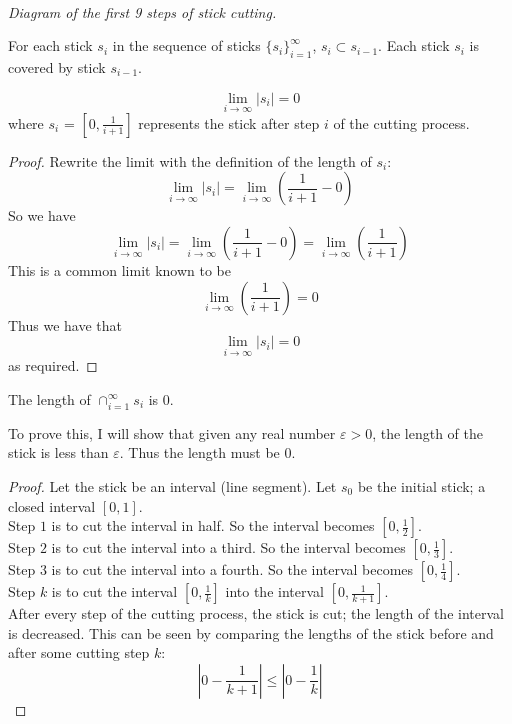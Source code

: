 \documentclass[11pt]{ekblite}
\begin{document}
\begin{example}
	\\\textit{Diagram of the first 9 steps of stick cutting.}
	\begin{corollary}
		For each stick $s_i$ in the sequence of sticks $\{s_i\}_{i=1}^{\infty}$, $s_{i} \subset s_{i-1}$. Each stick $s_i$ is covered by stick $s_{i-1}$. 
		\end{corollary}
	\begin{corollary}
	\[\lim_{i \rightarrow \infty} |s_i| = 0\]
	where $s_i$ = $[0,\frac{1}{i+1}]$ represents the stick after step $i$ of the cutting process.	
	\end{corollary}
	\begin{proof}
		Rewrite the limit with the definition of the length of $s_i$: 
		\[\lim_{i \rightarrow \infty} |s_i| = \lim_{i \rightarrow \infty} \left(\frac{1}{i+1} - 0 \right)\]
		So we have
		\[\lim_{i \rightarrow \infty} |s_i| = \lim_{i \rightarrow \infty} \left(\frac{1}{i+1} - 0 \right)= \lim_{i \rightarrow \infty} \left(\frac{1}{i+1} \right)\]
		This is a common limit known to be
		\[\lim_{i \rightarrow \infty} \left(\frac{1}{i+1} \right) = 0\]
		Thus we have that
		\[\lim_{i \rightarrow \infty} |s_i| = 0\]
		as required.
	\end{proof}
	\begin{corollary}
		The length of $\cap_{i=1}^{\infty} s_i$ is 0. 
	\end{corollary}
	To prove this, I will show that given any real number $\varepsilon > 0$, the length of the stick is less than $\varepsilon$. Thus the length must be 0.
	\begin{proof}
		Let the stick be an interval (line segment). Let $s_0$ be the initial stick; a closed interval $[0,1]$.
		\\[0.2in]Step $1$ is to cut the interval in half. So the interval becomes $\left[0,\frac{1}{2}\right]$.
		\\[0.2in]Step $2$ is to cut the interval into a third. So the interval becomes $\left[0,\frac{1}{3}\right]$.
		\\[0.2in]Step $3$ is to cut the interval into a fourth. So the interval becomes $\left[0,\frac{1}{4}\right]$.
		\\[0.2in]Step $k$ is to cut the interval $\left[0,\frac{1}{k}\right]$ into the interval $\left[0,\frac{1}{k+1}\right]$.
		\\[0.2in]After every step of the cutting process, the stick is cut; the length of the interval is decreased. This can be seen by comparing the lengths of the stick before and after some cutting step $k$:
		\[\left| 0 - \frac{1}{k+1} \right| \le \left| 0 - \frac{1}{k} \right|\] 

\end{proof}
\end{example}
\end{document}
